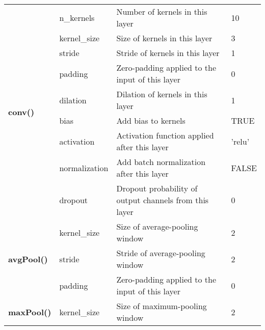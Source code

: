 \documentclass{article}
\begin{document}
\begin{table}
{\begin{tabular}{|llll|}
			\multirow{9}{*}{\textbf{conv()}}     & n\_kernels    & Number of kernels in this layer                                                                                                   & 10        \\
			& kernel\_size  & Size of kernels in this layer                                                                                                     & 3         \\
			& stride        & Stride of kernels in this layer                                                                                                   & 1         \\
			& padding       & Zero-padding applied to the input of this layer                                                                                   & 0         \\
			& dilation      & Dilation of kernels in this layer                                                                                                 & 1         \\
			& bias          & Add bias to kernels                                                                                                               & TRUE      \\
			& activation    & Activation function applied after this layer                                                                                      & 'relu'    \\
			& normalization & Add batch normalization after this layer                                                                                          & FALSE     \\
			& dropout       & Dropout probability of output channels from this layer                                                                            & 0         \\ \hline
			\multirow{3}{*}{\textbf{avgPool()}}  & kernel\_size  & Size of average-pooling window                                                                                                    & 2         \\
			& stride        & Stride of average-pooling window                                                                                                  & 2         \\
			& padding       & Zero-padding applied to the input of this layer                                                                                   & 0         \\ \hline
			\multirow{4}{*}{\textbf{maxPool()}}  & kernel\_size  & Size of maximum-pooling window                                                                                                    & 2         \\

\end{tabular}}
\end{table}
\end{document}
